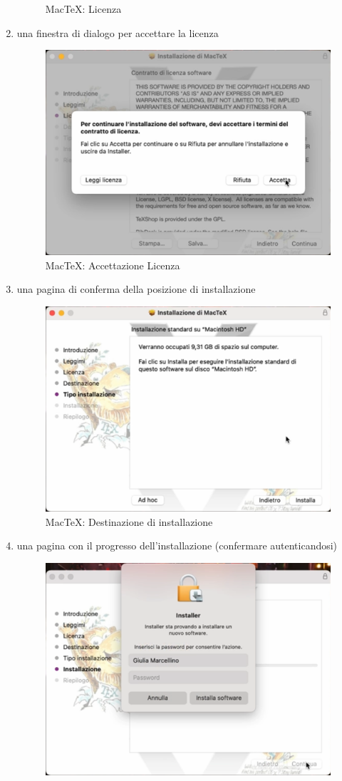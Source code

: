 \documentclass[envcountsame,envcountchap]{svmono}
\begin{document}
\begin{enumerate}
\begin{figure}[H]
            \caption{MacTeX: Licenza}
            \label{mactex_licenza}
        \end{figure}
    \item una finestra di dialogo per accettare la licenza
        \begin{figure}[H]
            \centering
            \includegraphics[width=0.5\linewidth]{images/texlive/mac/4_accettazione_licenza.png}
            \caption{MacTeX: Accettazione Licenza}
            \label{mactex_acc_licenza}
        \end{figure}
    \item una pagina di conferma della posizione di installazione
        \begin{figure}[H]
            \centering
            \includegraphics[width=0.5\linewidth]{images/texlive/mac/5_destinazione.png}
            \caption{MacTeX: Destinazione di installazione}
            \label{mactex_dest_installazione}
        \end{figure}
    \item una pagina con il progresso dell'installazione (confermare autenticandosi)
        \begin{figure}[H]
            \centering
            \includegraphics[width=0.5\linewidth]{images/texlive/mac/6_installazione.png}

\end{figure}
\end{enumerate}
\end{document}

